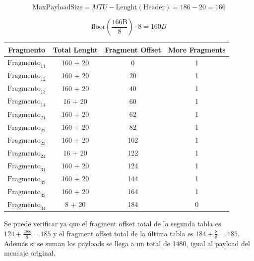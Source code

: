$$ \mathrm{MaxPayloadSize} = MTU - \mathrm{Lenght}(\mathrm{Header}) = 186 - 20 = 166 $$

$$\mathrm{floor}(\frac{\mathrm{166 B}}{8}) \cdot 8 = 160 B$$



\begin{center}
    \begin{tabular}{c|c|c|c}
        Fragmento & Total Lenght & Fragment Offset & More Fragments \\
        \hline
        \hline
        $ \mathrm{Fragmento}_{11} $ & 160 + 20  & 0 & 1\\
        \hline
        $ \mathrm{Fragmento}_{12} $ & 160 + 20  & 20 & 1\\
        \hline
        $ \mathrm{Fragmento}_{13} $ & 160 + 20  & 40 & 1\\
        \hline
        $ \mathrm{Fragmento}_{14} $ & 16 + 20  & 60 & 1\\
        \hline
        \hline
        \hline
        $ \mathrm{Fragmento}_{21} $ & 160 + 20  & 62 & 1\\
        \hline
        $ \mathrm{Fragmento}_{22} $ & 160 + 20  & 82 & 1\\
        \hline
        $ \mathrm{Fragmento}_{23} $ & 160 + 20  & 102 & 1\\
        \hline
        $ \mathrm{Fragmento}_{24} $ & 16 + 20  & 122 & 1\\
        \hline
        \hline
        \hline
        $ \mathrm{Fragmento}_{31} $ & 160 + 20  & 124 & 1\\
        \hline
        $ \mathrm{Fragmento}_{32} $ & 160 + 20  & 144 & 1\\
        \hline
        $ \mathrm{Fragmento}_{33} $ & 160 + 20  & 164 & 1\\
        \hline
        $ \mathrm{Fragmento}_{34} $ & 8 + 20  & 184 & 0\\
    \end{tabular}
\end{center}

Se puede verificar ya que el fragment offset total de la segunda tabla es $124 + \frac{488}{8} = 185$ y el fragment offset total de la última tabla es $184 + \frac{8}{8} = 185$. 
Además si se suman los payloads se llega a un total de 1480, igual al payload del mensaje original.


